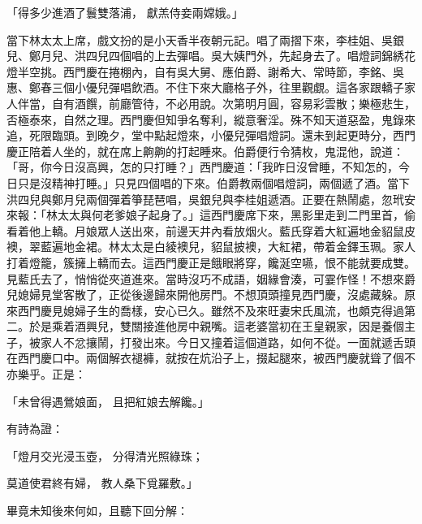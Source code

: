\begin{showcontents}{}
「得多少進酒了鬟雙落浦，  獻羔侍妾兩嫦娥。」

當下林太太上席，戲文扮的是小天香半夜朝元記。唱了兩摺下來，李桂姐、吳銀兒、鄭月兒、洪四兒四個唱的上去彈唱。吳大姨門外，先起身去了。唱燈詞錦綉花燈半空挑。西門慶在捲棚內，自有吳大舅、應伯爵、謝希大、常時節，李銘、吳惠、鄭春三個小優兒彈唱飲酒。不住下來大廳格子外，往里觀覷。這各家跟轎子家人伴當，自有酒饌，前廳管待，不必用說。次第明月圓，容易彩雲散；樂極悲生，否極泰來，自然之理。西門慶但知爭名奪利，縱意奢淫。殊不知天道惡盈，鬼錄來追，死限臨頭。到晚夕，堂中點起燈來，小優兒彈唱燈詞。還未到起更時分，西門慶正陪着人坐的，就在席上齁齁的打起睡來。伯爵便行令猜枚，鬼混他，說道：「哥，你今日沒高興，怎的只打睡？」西門慶道：「我昨日沒曾睡，不知怎的，今日只是沒精神打睡。」只見四個唱的下來。伯爵教兩個唱燈詞，兩個遞了酒。當下洪四兒與鄭月兒兩個彈着箏琵琶唱，吳銀兒與李桂姐遞酒。正要在熱鬧處，忽玳安來報：「林太太與何老爹娘子起身了。」這西門慶席下來，黑影里走到二門里首，偷看着他上轎。月娘眾人送出來，前邊天井內看放烟火。藍氏穿着大紅遍地金貂鼠皮襖，翠藍遍地金裙。林太太是白綾襖兒，貂鼠披襖，大紅裙，帶着金鐸玉珮。家人打着燈籠，簇擁上轎而去。這西門慶正是餓眼將穿，饞涎空嚥，恨不能就要成雙。見藍氏去了，悄悄從夾道進來。當時沒巧不成語，姻緣會湊，可霎作怪！不想來爵兒媳婦見堂客散了，正從後邊歸來開他房門。不想頂頭撞見西門慶，沒處藏躲。原來西門慶見媳婦子生的喬樣，安心已久。雖然不及來旺妻宋氏風流，也頗克得過第二。於是乘着酒興兒，雙關接進他房中親嘴。這老婆當初在王皇親家，因是養個主子，被家人不忿攘鬧，打發出來。今日又撞着這個道路，如何不從。一面就遞舌頭在西門慶口中。兩個解衣褪褲，就按在炕沿子上，掇起腿來，被西門慶就聳了個不亦樂乎。正是：

「未曾得遇鶯娘面，  且把紅娘去解饞。」

有詩為證：

「燈月交光浸玉壺，  分得清光照綠珠；

莫道使君終有婦，  教人桑下覓羅敷。」

畢竟未知後來何如，且聽下回分解：






\end{showcontents}


